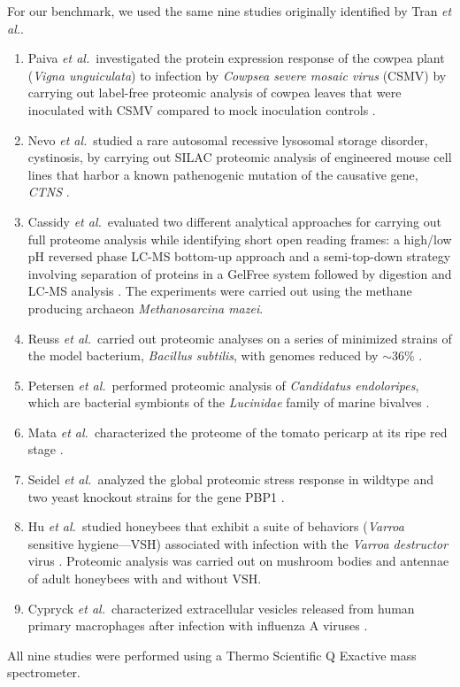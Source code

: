 \documentclass{article}
\begin{document}
For our benchmark, we used the same nine studies originally identified by Tran {\em et al.}. \cite{tran2017denovo}
\begin{enumerate}
\item Paiva \textit{et al.}\ investigated the protein expression response of the cowpea plant (\textit{Vigna unguiculata}) to infection by \textit{Cowpsea severe mosaic virus} (CSMV) by carrying out label-free proteomic analysis of cowpea leaves that were inoculated with CSMV compared to mock inoculation controls \cite{paiva2016label}.
\item Nevo \textit{et al.}\ studied a rare autosomal recessive lysosomal storage disorder, cystinosis, by carrying out SILAC proteomic analysis of engineered mouse cell lines that harbor a known pathenogenic mutation of the causative gene, \textit{CTNS} \cite{nevo2017impact}.
\item Cassidy \textit{et al.}\ evaluated two different analytical approaches for carrying out full proteome analysis while identifying short open reading frames: a high/low pH reversed phase LC-MS bottom-up approach and a semi-top-down strategy involving separation of proteins in a GelFree system followed by digestion and LC-MS analysis \cite{cassidy2016combination}. The experiments were carried out using the methane producing archaeon \textit{Methanosarcina mazei}.
\item Reuss \textit{et al.}\ carried out proteomic analyses on a series of minimized strains of the model bacterium, \textit{Bacillus subtilis}, with genomes reduced by $\sim$36\% \cite{reuss2017large}.
\item Petersen \textit{et al.}\ performed proteomic analysis of \textit{Candidatus endoloripes}, which are bacterial symbionts of the \textit{Lucinidae} family of marine bivalves \cite{petersen2016chemosynthetic}.
\item Mata \textit{et al.}\ characterized the proteome of the tomato pericarp at its ripe red stage \cite{mata2017depth}.
\item Seidel \textit{et al.}\ analyzed the global proteomic stress response in wildtype and two yeast knockout strains for the gene PBP1  \cite{seidel2017quantitative}.
\item Hu \textit{et al.}\ studied honeybees that exhibit a suite of behaviors (\textit{Varroa} sensitive hygiene---VSH) associated with infection with the \textit{Varroa destructor} virus \cite{hu2016proteome}.  Proteomic analysis was carried out on mushroom bodies and antennae of adult honeybees with and without VSH.
\item Cypryck \textit{et al.}\ characterized extracellular vesicles released from human primary macrophages after infection with influenza A viruses \cite{cypryk2017proteomic}.
\end{enumerate}
All nine studies were performed using a Thermo Scientific Q Exactive mass spectrometer.
\end{document}
